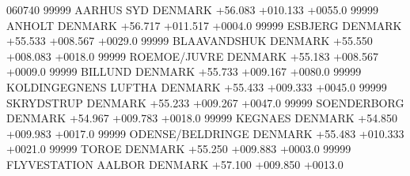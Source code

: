 060740 99999 AARHUS SYD                     DENMARK                                                                            +56.083  +010.133   +0055.0 99999 ANHOLT                         DENMARK                                                                            +56.717  +011.517   +0004.0 99999 ESBJERG                        DENMARK                                                                            +55.533  +008.567   +0029.0 99999 BLAAVANDSHUK                   DENMARK                                                                            +55.550  +008.083   +0018.0 99999 ROEMOE/JUVRE                   DENMARK                                                                            +55.183  +008.567   +0009.0 99999 BILLUND                        DENMARK                                                                            +55.733  +009.167   +0080.0 99999 KOLDINGEGNENS LUFTHA           DENMARK                                                                            +55.433  +009.333   +0045.0 99999 SKRYDSTRUP                     DENMARK                                                                            +55.233  +009.267   +0047.0 99999 SOENDERBORG                    DENMARK                                                                            +54.967  +009.783   +0018.0 99999 KEGNAES                        DENMARK                                                                            +54.850  +009.983   +0017.0 99999 ODENSE/BELDRINGE               DENMARK                                                                            +55.483  +010.333   +0021.0 99999 TOROE                          DENMARK                                                                            +55.250  +009.883   +0003.0 99999 FLYVESTATION AALBOR            DENMARK                                                                            +57.100  +009.850   +0013.0\newline